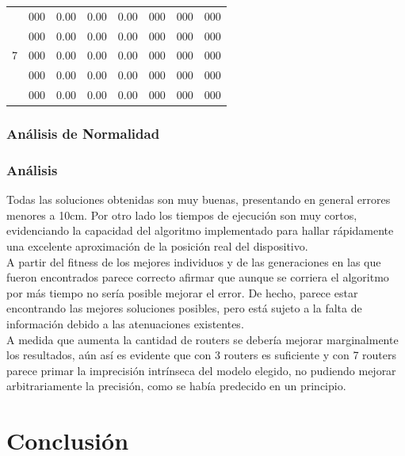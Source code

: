 \documentclass[journal]{IEEEtran}
\begin{document}
\begin{table}[h]
\begin{tabular}{|c||c||c|c|c||c|c|c|}
\multirow{5}{*}{7} & 000 & 0.00 & 0.00 & 0.00 & 000 & 000 & 000 \\
                   & 000 & 0.00 & 0.00 & 0.00 & 000 & 000 & 000 \\
                   & 000 & 0.00 & 0.00 & 0.00 & 000 & 000 & 000 \\
                   & 000 & 0.00 & 0.00 & 0.00 & 000 & 000 & 000 \\
                   & 000 & 0.00 & 0.00 & 0.00 & 000 & 000 & 000 \\\hline
\end{tabular}

\label{tab:evaluation}
\end{table}


\subsubsection{Análisis de Normalidad}


\subsubsection*{Análisis}

Todas las soluciones obtenidas son muy buenas, presentando en general errores menores a 10cm. Por otro lado los tiempos de ejecución son muy cortos, evidenciando la capacidad del algoritmo implementado para hallar rápidamente una excelente aproximación de la posición real del dispositivo.\\

A partir del fitness de los mejores individuos y de las generaciones en las que fueron encontrados parece correcto afirmar que aunque se corriera el algoritmo por más tiempo no sería posible mejorar el error. De hecho, parece estar encontrando las mejores soluciones posibles, pero está sujeto a la falta de información debido a las atenuaciones existentes.\\

A medida que aumenta la cantidad de routers se debería mejorar marginalmente los resultados, aún así es evidente que con 3 routers es suficiente y con 7 routers parece primar la imprecisión intrínseca del modelo elegido, no pudiendo mejorar arbitrariamente la precisión, como se había predecido en un principio.\\

\section{Conclusión}
\end{document}
